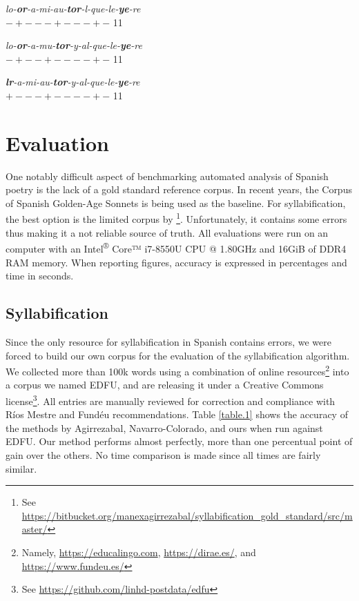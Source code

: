 \documentclass[a4paper,11pt,twocolumn,twoside]{article}
\begin{document}
\begin{subexamples}[preamble={\textit{loor a mi autor, y al que leyere}}]\label{example.4}
\item\label{example.4a}
\textit{lo-\textbf{or}-a-mi-au-\textbf{tor}-l-que-le-\textbf{ye}-re} \\
$-+---+---+-$ 11 \\
\item\label{example.4b}
\textit{lo-\textbf{or}-a-mu-\textbf{tor}-y-al-que-le-\textbf{ye}-re} \\
$-+--+----+-$ 11 \\
\item\label{example.4c}
\textit{\textbf{lr}-a-mi-au-\textbf{tor}-y-al-que-le-\textbf{ye}-re} \\
$+---+----+-$ 11 \\
\end{subexamples}

\section{Evaluation}
One notably difficult aspect of benchmarking automated analysis of Spanish poetry is the lack of a gold standard reference corpus. In recent years, the Corpus of Spanish Golden-Age Sonnets \cite{navarro2016metrical} is being used as the baseline. For syllabification, the best option is the limited corpus by \cite{agirrezabal2014assigning}\footnote{See \url{https://bitbucket.org/manexagirrezabal/syllabification_gold_standard/src/master/}}. Unfortunately, it contains some errors thus making it a not reliable source of truth. All evaluations were run on an computer with an Intel\textsuperscript{®} Core™ i7-8550U CPU @ 1.80GHz and 16GiB of DDR4 RAM memory. When reporting figures, accuracy is expressed in percentages and time in seconds.

\subsection{Syllabification}
Since the only resource for syllabification in Spanish contains errors, we were forced to build our own corpus for the evaluation of the syllabification algorithm. We collected more than 100k words using a combination of online resources\footnote{Namely, \url{https://educalingo.com}, \url{https://dirae.es/}, and \url{https://www.fundeu.es/}} into a corpus we named EDFU, and are releasing it under a Creative Commons license\footnote{See \url{https://github.com/linhd-postdata/edfu}}. All entries are manually reviewed for correction and compliance with Ríos Mestre and Fundéu recommendations.
Table \ref{table.1} shows the accuracy of the methods by Agirrezabal, Navarro-Colorado, and ours when run against EDFU. Our method performs almost perfectly, more than one percentual point of gain over the others. No time comparison is made since all times are fairly similar.
\end{document}
